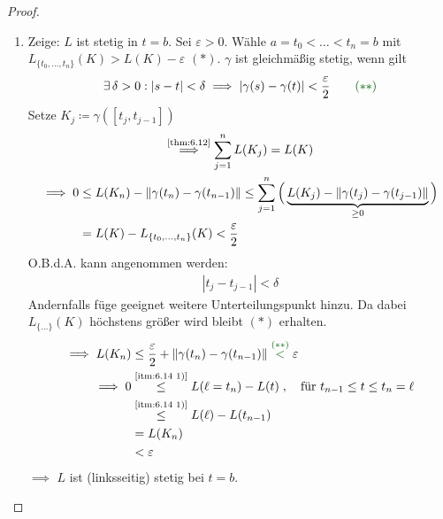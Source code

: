 \begin{theorem}[Hilfssatz]
\begin{proof}
\begin{enum-arab}
      \item \label{itm:6.14 2)}
      \begin{enumerate}
        \item \label{itm:6.14 2)a}Zeige: $L$ ist stetig in $t=b$. Sei $\varepsilon > 0$. Wähle $a = t_0 < \ldots < t_n = b$ mit $L_{\{t_0,\ldots,t_n\}}(K) > L(K) - \varepsilon$ {\color{DarkRed} $(*)$}. $\gamma$ ist gleichmäßig stetig, wenn gilt
        \begin{align*}
          \exists \, \delta > 0 : |s-t| < \delta \implies |\gamma(s) - \gamma(t)| < \frac{\varepsilon}{2} \tag*{\color{DarkGreen} $(**)$}
        \end{align*}
        Setze $K_j \coloneq \gamma([t_j,t_{j-1}])$
        \begin{gather*}
          \overset{\text{\ref{thm:6.12}}}{\implies} \sum\limits_{j=1}^{n} L(K_j) = L(K) \\
          \begin{aligned}
            \implies 0 &\leq L(K_n) - \|\gamma(t_n)-\gamma(t_{n-1})\|
            \leq \sum\limits_{j=1}^{n} \Big( \underbrace{L(K_j) - \|\gamma(t_j)-\gamma(t_{j-1})\|}_{\geq 0} \Big) \\
            &= L(K) - L_{\{t_0,\ldots,t_n\}}(K) < \frac{\varepsilon}{2}
          \end{aligned}
        \end{gather*}
        O.B.d.A. kann angenommen werden:
        \begin{align*}
          |t_j - t_{j-1}| < \delta
        \end{align*}
        Andernfalls füge geeignet weitere Unterteilungspunkt hinzu. Da dabei $L_{\{\ldots\}}(K)$ höchstens größer wird bleibt {\color{DarkRed} $(*)$} erhalten.
        \begin{align*}
          \implies L(K_n) &\leq \frac{\varepsilon}{2} + \|\gamma(t_n) - \gamma(t_{n-1})\| \overset{\color{DarkGreen} (**)}{<} \varepsilon \\
          \implies 0 &\overset{\text{\ref{itm:6.14 1)}}}{\leq} L(\ell = t_n) - L(t) \; , \quad \text{für } t_{n-1} \leq t \leq t_n = \ell \\
          &\overset{\text{\ref{itm:6.14 1)}}}{\leq} L(\ell) - L(t_{n-1}) \\
          &= L(K_n) \\
          &< \varepsilon
        \end{align*}
        $\implies$ $L$ ist (linksseitig) stetig bei $t=b$.
        

\end{enumerate}
\end{enum-arab}
\end{proof}
\end{theorem}

